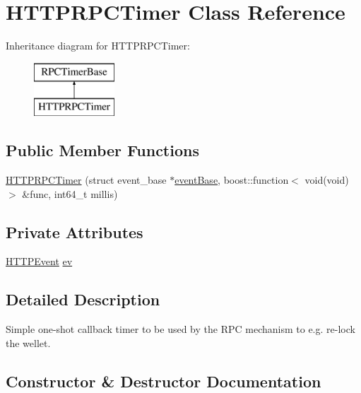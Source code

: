 \hypertarget{class_h_t_t_p_r_p_c_timer}{}\section{H\+T\+T\+P\+R\+P\+C\+Timer Class Reference}
\label{class_h_t_t_p_r_p_c_timer}
Inheritance diagram for H\+T\+T\+P\+R\+P\+C\+Timer\+:\begin{figure}[H]
\begin{center}
\leavevmode
\includegraphics[height=2.000000cm]{class_h_t_t_p_r_p_c_timer}
\end{center}
\end{figure}
\subsection*{Public Member Functions}
\begin{DoxyCompactItemize}
\item 
\mbox{\hyperlink{class_h_t_t_p_r_p_c_timer_a49684c3012a9464ecea921bc3af4c2b5}{H\+T\+T\+P\+R\+P\+C\+Timer}} (struct event\+\_\+base $\ast$\mbox{\hyperlink{httpserver_8cpp_a5522823075f10647b77372d0b060f2da}{event\+Base}}, boost\+::function$<$ void(void)$>$ \&func, int64\+\_\+t millis)
\end{DoxyCompactItemize}
\subsection*{Private Attributes}
\begin{DoxyCompactItemize}
\item 
\mbox{\hyperlink{class_h_t_t_p_event}{H\+T\+T\+P\+Event}} \mbox{\hyperlink{class_h_t_t_p_r_p_c_timer_aca63bafcdfbea3f1a2c30b0c8c885a56}{ev}}
\end{DoxyCompactItemize}


\subsection{Detailed Description}
Simple one-\/shot callback timer to be used by the R\+PC mechanism to e.\+g. re-\/lock the wellet. 

\subsection{Constructor \& Destructor Documentation}
\mbox{\label{class_h_t_t_p_r_p_c_timer_a49684c3012a9464ecea921bc3af4c2b5}} 

